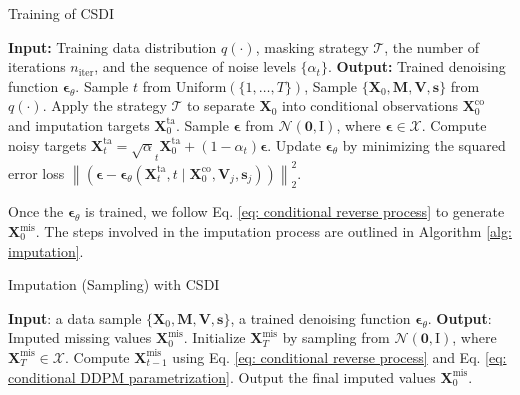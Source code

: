 \documentclass[11pt]{article}
\begin{document}
\begin{algorithm}
\caption{Training of CSDI}\label{alg: training}
\begin{algorithmic}[1] %
\State \textbf{Input:} Training data distribution $q(\cdot)$, masking strategy $\mathcal{T}$, the number of iterations $n_{\mathrm{iter}}$, and the sequence of noise levels $\{\alpha_t\}$.
\State \textbf{Output:} Trained denoising function $\bm{\epsilon}_{\theta}$.
    \State Sample $t$ from Uniform$(\{1,\ldots, T\})$, Sample $\{\bm{X}_0, \bm{M}, \bm{V}, \bm{s}\}$ from $q(\cdot)$.
    \State Apply the strategy $\mathcal{T}$ to separate $\bm{X}_0$ into conditional  observations $\bm{X}_0^{\mathrm{co}}$ and imputation targets $\bm{X}_0^{\mathrm{ta}}$.
    \State Sample $\bm{\epsilon}$ from $\mathcal{N}(\bm{0}, \mathrm{I})$, where $\bm{\epsilon}\in \mathcal{X}$.
    \State Compute noisy targets $\bm{X}_t^{\mathrm{ta}}=\sqrt{\alpha}_t \bm{X}_0^{\mathrm{ta}} + (1-\alpha_t)\bm{\epsilon}$.
    \State Update $\bm{\epsilon}_{\theta}$ by minimizing the squared error loss $\left\|\left(\boldsymbol{\epsilon}-\boldsymbol{\epsilon}_\theta\left(\mathbf{X}_t^{\mathrm{ta}}, t \mid \bm{X}_0^{\mathrm{co}},\bm{V}_j,\bm{s}_j\right)\right)\right\|_2^2$.
\EndFor
\end{algorithmic}
\end{algorithm}


Once the $\bm{\epsilon}_{\theta}$ is trained, we follow Eq. \ref{eq: conditional reverse process} to generate $\bm{X}_0^{\mathrm{mis}}$. The steps involved in the imputation process are outlined in Algorithm \ref{alg: imputation}.

\begin{algorithm}
\caption{Imputation (Sampling) with CSDI}\label{alg: imputation}
\begin{algorithmic}[1] 
\State \textbf{Input}: a data sample $\{\bm{X}_0,\bm{M},\bm{V}, \bm{s}\}$, a trained denoising function $\bm{\epsilon}_{\theta}$.
\State \textbf{Output}: Imputed missing values $\bm{X}_0^{\mathrm{mis}}$.
\State Initialize $\bm{X}_T^{\mathrm{mis}}$ by sampling from  $\mathcal{N}(\bm{0}, \bm{\mathrm{I}})$, where $\bm{X}_T^{\mathrm{mis}}\in \mathcal{X}$.
     \State Compute $\bm{X}_{t-1}^{\mathrm{mis}}$ using Eq. \ref{eq: conditional reverse process} and Eq. \ref{eq: conditional DDPM parametrization}.
\EndFor
\State Output the final imputed values
 $\bm{X}_0^{\mathrm{mis}}$.
\end{algorithmic}
\end{algorithm}
\end{document}
